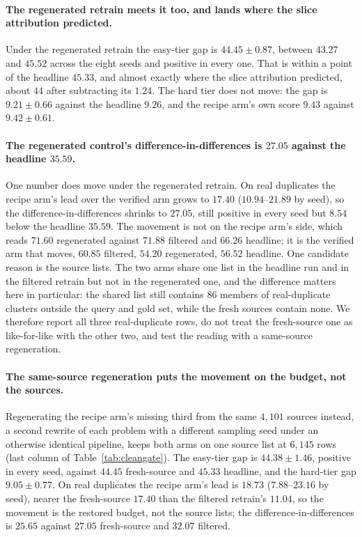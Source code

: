 \paragraph{The regenerated retrain meets it too, and lands where the slice attribution predicted.}Under the regenerated retrain the easy-tier gap is $44.45 \pm 0.87$, between $43.27$ and $45.52$ across the eight seeds and positive in every one. That is within a point of the headline $45.33$, and almost exactly where the slice attribution predicted, about $44$ after subtracting its $1.24$. The hard tier does not move: the gap is $9.21 \pm 0.66$ against the headline $9.26$, and the recipe arm's own score $9.43$ against $9.42 \pm 0.61$.

\paragraph{The regenerated control's difference-in-differences is $27.05$ against the headline $35.59$.}
One number does move under the regenerated retrain. On real duplicates the recipe arm's lead over the verified arm grows to $17.40$ ($10.94$--$21.89$ by seed), so the difference-in-differences shrinks to $27.05$, still positive in every seed but $8.54$ below the headline $35.59$. The movement is not on the recipe arm's side, which reads $71.60$ regenerated against $71.88$ filtered and $66.26$ headline; it is the verified arm that moves, $60.85$ filtered, $54.20$ regenerated, $56.52$ headline. One candidate reason is the source lists. The two arms share one list in the headline run and in the filtered retrain but not in the regenerated one, and the difference matters here in particular: the shared list still contains $86$ members of real-duplicate clusters outside the query and gold set, while the fresh sources contain none. We therefore report all three real-duplicate rows, do not treat the fresh-source one as like-for-like with the other two, and test the reading with a same-source regeneration.

\paragraph{The same-source regeneration puts the movement on the budget, not the sources.}Regenerating the recipe arm's missing third from the same $4{,}101$ sources instead, a second rewrite of each problem with a different sampling seed under an otherwise identical pipeline, keeps both arms on one source list at $6{,}145$ rows (last column of Table~\ref{tab:cleangate}). The easy-tier gap is $44.38 \pm 1.46$, positive in every seed, against $44.45$ fresh-source and $45.33$ headline, and the hard-tier gap $9.05 \pm 0.77$. On real duplicates the recipe arm's lead is $18.73$ ($7.88$--$23.16$ by seed), nearer the fresh-source $17.40$ than the filtered retrain's $11.04$, so the movement is the restored budget, not the source lists; the difference-in-differences is $25.65$ against $27.05$ fresh-source and $32.07$ filtered.

